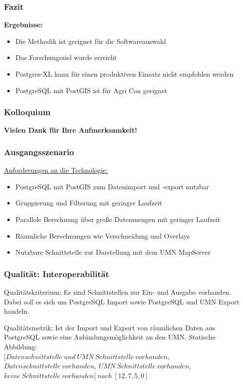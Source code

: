 \documentclass{beamer}
\begin{document}
\begin{frame}\frametitle{Fazit}
\textbf{Ergebnisse:}\\
\begin{itemize}
\item Die Methodik ist geeignet für die Softwareauswahl
\item Das Forschungsziel wurde erreicht
\item Postgres-XL kann für einen produktiven Einsatz nicht empfohlen werden
\item PostgreSQL mit PostGIS ist für Agri Con geeignet
\end{itemize}
\end{frame}
 
\begin{frame}\frametitle{Kolloquium}
\begin{center}
\textbf{Vielen Dank für Ihre Aufmerksamkeit!}
\end{center}
\end{frame} 
 
\begin{frame}\frametitle{}

\end{frame} 

\begin{frame}\frametitle{Ausgangsszenario}
\underline{Anforderungen an die Technologie:}
\begin{itemize}
\item PostgreSQL mit PostGIS zum Datenimport und -export nutzbar
\item Gruppierung und Filterung mit geringer Laufzeit
\item Parallele Berechnung über große Datenmengen mit geringer Laufzeit
\item Räumliche Berechnungen wie Verschneidung und Overlays
\item Nutzbare Schnittstelle zur Darstellung mit dem UMN MapServer
\end{itemize}
\end{frame}
 
\begin{frame}\frametitle{Qualität: Interoperabilität}
\begin{block}{Qualitätskriterium:}
Es sind Schnittstellen zur Ein- und Ausgabe vorhanden. Dabei soll es sich um PostgreSQL Import sowie PostgreSQL und UMN Export handeln.
\end{block}

\begin{block}{Qualitätsmetrik:}
Ist der Import und Export von räumlichen Daten aus PostgreSQL sowie eine Anbindungsmöglichkeit an den UMN.
Statische Abbildung:\\
$[Datenschnittstelle\ und\ UMN\ Schnittstelle\ vorhanden,$\\$Datenschnittstelle\ vorhanden,\ UMN\ Schnittstelle\ vorhanden,$\\$keine\ Schnittstelle\ vorhanden]\ nach\ [12,7,5,0]$
\end{block}
\end{frame} 
\end{document}

